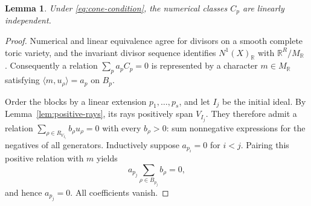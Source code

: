 \documentclass[11pt]{amsart}
\newtheorem{lemma}[theorem]{Lemma}
\theoremstyle{definition}
\theoremstyle{remark}
\newcommand{\RR}{\mathbb R}
\begin{document}
\begin{lemma}\label{lem:independence}
Under \eqref{eq:cone-condition}, the numerical classes $C_p$ are
linearly independent.
\end{lemma}
\begin{proof}
Numerical and linear equivalence agree for divisors on a smooth
complete toric variety, and the invariant divisor sequence identifies
$N^1(X)_\RR$ with $\RR^R/M_\RR$
\cite[Propositions~6.3.15 and 6.4.1]{CLS}.
Consequently a relation $\sum_pa_pC_p=0$ is represented by a character
$m\in M_\RR$ satisfying $\langle m,u_\rho\rangle=a_p$ on $B_p$.

Order the blocks by a linear extension $p_1,\ldots,p_s$, and let $I_j$
be the initial ideal. By Lemma~\ref{lem:positive-rays}, its rays
positively span $V_{I_j}$. They therefore admit a relation
$\sum_{\rho\in R_{V_{I_j}}}b_\rho u_\rho=0$ with every $b_\rho>0$:
sum nonnegative expressions for the negatives of all generators.
Inductively suppose $a_{p_i}=0$ for $i<j$. Pairing this positive
relation with $m$ yields
\[
 a_{p_j}\sum_{\rho\in B_{p_j}}b_\rho=0,
\]
and hence $a_{p_j}=0$. All coefficients vanish.
\end{proof}
\end{document}
